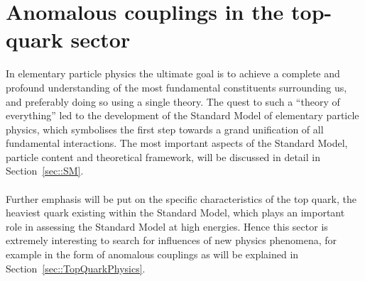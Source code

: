 \chapter{Anomalous couplings in the top-quark sector} \label{chp::SM}


In elementary particle physics the ultimate goal is to achieve a complete and profound understanding of the most fundamental constituents surrounding us, and preferably doing so using a single theory.
The quest to such a ``theory of everything'' led to the development of the Standard Model of elementary particle physics, which symbolises the first step towards a grand unification of all fundamental interactions. %
The most important aspects of the Standard Model, particle content and theoretical framework, will be discussed in detail in Section~\ref{sec::SM}.
\\
\\
Further emphasis will be put on the specific characteristics of the top quark, the heaviest quark existing within the Standard Model, which plays an important role in assessing the Standard Model at high energies. 
Hence this sector is extremely interesting to search for influences of new physics phenomena, for example in the form of anomalous couplings as will be explained in Section~\ref{sec::TopQuarkPhysics}.

